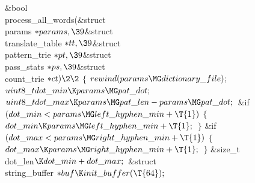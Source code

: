 \Y\B\1\1\&{bool} \\{process\_all\_words}(\&{struct} \\{params} ${}{*}%
\\{params},\39{}$\&{struct} \\{translate\_table} ${}{*}\\{tt},\39{}$\&{struct} %
\\{pattern\_trie} ${}{*}\\{pt},\39{}$\&{struct} \\{pass\_stats} ${}{*}\\{ps},%
\39{}$\&{struct} \\{count\_trie} ${}{*}\\{ct})\2\2{}$\6
${}\{{}$\1\6
${}\\{rewind}(\\{params}\MG\\{dictionary\_file});{}$\6
${}\\{uint8\_t}\\{dot\_min}\K\\{params}\MG\\{pat\_dot};{}$\6
${}\\{uint8\_t}\\{dot\_max}\K\\{params}\MG\\{pat\_len}-\\{params}\MG\\{pat%
\_dot};{}$\6
\&{if} ${}(\\{dot\_min}<\\{params}\MG\\{left\_hyphen\_min}+\T{1}){}$\5
${}\{{}$\1\6
${}\\{dot\_min}\K\\{params}\MG\\{left\_hyphen\_min}+\T{1};{}$\6
\4${}\}{}$\2\6
\&{if} ${}(\\{dot\_max}<\\{params}\MG\\{right\_hyphen\_min}+\T{1}){}$\5
${}\{{}$\1\6
${}\\{dot\_max}\K\\{params}\MG\\{right\_hyphen\_min}+\T{1};{}$\6
\4${}\}{}$\2\7
\&{size\_t} \\{dot\_len}${}\K\\{dot\_min}+\\{dot\_max};{}$\6
\&{struct} \\{string\_buffer} ${}{*}\\{buf}\K\\{init\_buffer}(\T{64});{}$\7
